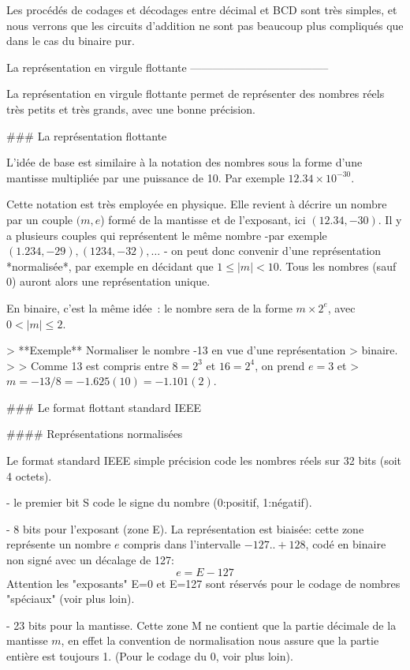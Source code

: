 Les procédés de codages et décodages entre décimal et BCD sont très
simples, et nous verrons que les circuits d'addition ne sont pas
beaucoup plus compliqués que dans le cas du binaire pur.

La représentation en virgule flottante
--------------------------------------

La représentation en virgule flottante permet de représenter des nombres
réels très petits et très grands, avec une bonne précision.

### La représentation flottante

L'idée de base est similaire à la notation des nombres sous la forme
d'une mantisse multipliée par une puissance de 10. Par exemple
$12.34 \times 10^{-30}$.

Cette notation est très employée en physique. Elle revient à décrire un
nombre par un couple $(m,e$) formé de la mantisse et de l'exposant, ici
$(12.34, -30)$. Il y a plusieurs couples qui représentent le même nombre
-par exemple $(1.234, -29), (1234, -32), \ldots$ - on peut donc convenir
d'une représentation *normalisée*, par exemple en décidant que
$1 \leq | m | < 10$. Tous les nombres (sauf 0) auront alors une
représentation unique.

En binaire, c'est la même idée : le nombre sera de la forme
$m \times 2^e$, avec $0 < | m | \leq 2$.

> **Exemple** Normaliser le nombre -13 en vue d'une représentation
> binaire.
>
> Comme 13 est compris entre $8=2^3$ et $16=2^4$, on prend $e=3$ et
> $m=-13/8= -1.625 (10) = -1.101 (2)$.

### Le format flottant standard IEEE

#### Représentations normalisées

Le format standard IEEE simple précision code les nombres réels sur 32
bits (soit 4 octets).

-   le premier bit S code le signe du nombre (0:positif, 1:négatif).

-   8 bits pour l'exposant (zone E). La représentation est biaisée:
    cette zone représente un nombre $e$ compris dans l'intervalle
    $-127..+128$, codé en binaire non signé avec un décalage de 127:
    $$e = E -127$$ Attention les "exposants" E=0 et E=127 sont réservés
    pour le codage de nombres "spéciaux" (voir plus loin).

-   23 bits pour la mantisse. Cette zone M ne contient que la partie
    décimale de la mantisse $m$, en effet la convention de normalisation
    nous assure que la partie entière est toujours 1. (Pour le codage
    du 0, voir plus loin).

